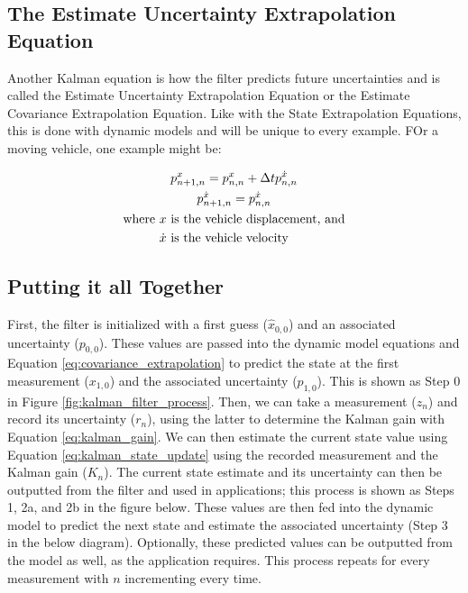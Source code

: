 \subsection{The Estimate Uncertainty Extrapolation Equation} 
Another Kalman equation is how the filter predicts future uncertainties and is called the Estimate Uncertainty Extrapolation Equation or the Estimate Covariance Extrapolation Equation.
Like with the State Extrapolation Equations, this is done with dynamic models and will be unique to every example.
FOr a moving vehicle, one example might be:

\begin{gather} \labeq{covariance_extrapolation}
    p_{n+1,n}^x = p_{n,n}^x + \Delta t p_{n,n}^{\dot{x}} \\
    p_{n+1,n}^{\dot{x}} = p_{n,n}^{\dot{x}} \\
    \begin{aligned}
    \text{where } &x \text{ is the vehicle displacement, and} \\
                  &\dot{x} \text{ is the vehicle velocity}
    \end{aligned}
\end{gather}

\subsection{Putting it all Together}
First, the filter is initialized with a first guess ($\hat{x}_{0,0}$) and an associated uncertainty ($p_{0,0}$).
These values are passed into the dynamic model equations and Equation \ref{eq:covariance_extrapolation} to predict the state at the first measurement ($x_{1,0}$) and the associated uncertainty ($p_{1,0}$).
This is shown as Step 0 in Figure \ref{fig:kalman_filter_process}.
Then, we can take a measurement ($z_n$) and record its uncertainty ($r_n$), using the latter to determine the Kalman gain with Equation \ref{eq:kalman_gain}.
We can then estimate the current state value using Equation \ref{eq:kalman_state_update} using the recorded measurement and the Kalman gain ($K_n$).
The current state estimate and its uncertainty can then be outputted from the filter and used in applications; this process is shown as Steps 1, 2a, and 2b in the figure below.
These values are then fed into the dynamic model to predict the next state and estimate the associated uncertainty (Step 3 in the below diagram).
Optionally, these predicted values can be outputted from the model as well, as the application requires.
This process repeats for every measurement with $n$ incrementing every time.

